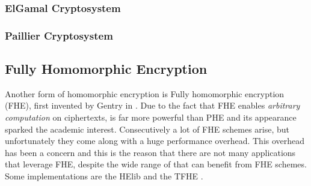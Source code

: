 \subsubsection{ElGamal Cryptosystem}\label{ss:elgamal}



\subsubsection{Paillier Cryptosystem}\label{ss:paillier}



\subsection{Fully Homomorphic Encryption}\label{ss:fhe}
Another form of homomorphic encryption is Fully homomorphic encryption (FHE), first invented by Gentry in \cite{gentry2009fully}.
Due to the fact that FHE enables \textit{arbitrary computation} on ciphertexts, is far more powerful than PHE and its appearance sparked the academic interest.
Consecutively a lot of FHE schemes arise, but unfortunately they come along with a huge performance overhead.
This overhead has been a concern and this is the reason that there are not many applications that leverage FHE, despite the wide range of that can benefit from FHE schemes.
Some implementations are the HElib \cite{halevi2014algorithms} and the TFHE \cite{chillotti2016faster}.


